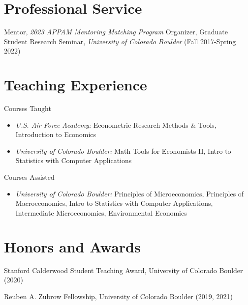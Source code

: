 \documentclass[letterpaper]{article}
\begin{document}
\section*{Professional Service}
Mentor, \textit{2023 APPAM Mentoring Matching Program}
\newline\newline
Organizer, Graduate Student Research Seminar, \textit{University of Colorado Boulder} (Fall 2017-Spring 2022)

\section*{Teaching Experience}
  Courses Taught 
  \begin{itemize}[topsep=2pt,itemsep=-1pt,leftmargin=1em]
    \item[] \textit{U.S. Air Force Academy:} Econometric Research Methods \& Tools, Introduction to Economics
    \item[] \textit{University of Colorado Boulder:} Math Tools for Economists II, Intro to Statistics with Computer Applications
  \end{itemize}
  \vspace*{.5em}
	Courses Assisted
	\begin{itemize}[topsep=2pt,itemsep=-1pt,leftmargin=1em]
    \item[] \textit{University of Colorado Boulder:} Principles of Microeconomics, Principles of Macroeconomics, Intro to Statistics with Computer Applications, Intermediate Microeconomics, Environmental Economics
  \end{itemize}
\section*{Honors and Awards}
	Stanford Calderwood Student Teaching Award, University of Colorado Boulder (2020)

	Reuben A. Zubrow Fellowship, University of Colorado Boulder (2019, 2021)
\end{document}
